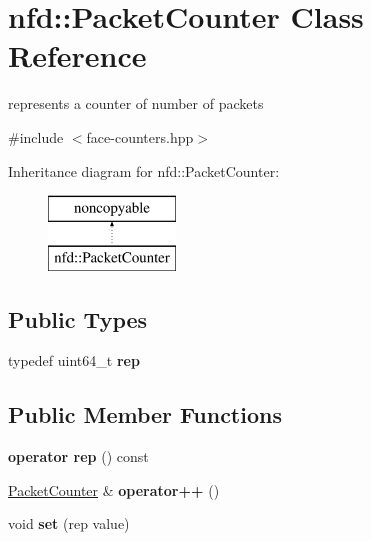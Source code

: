 \hypertarget{classnfd_1_1PacketCounter}{}\section{nfd\+:\+:Packet\+Counter Class Reference}
\label{classnfd_1_1PacketCounter}


represents a counter of number of packets  




{\ttfamily \#include $<$face-\/counters.\+hpp$>$}

Inheritance diagram for nfd\+:\+:Packet\+Counter\+:\begin{figure}[H]
\begin{center}
\leavevmode
\includegraphics[height=2.000000cm]{classnfd_1_1PacketCounter}
\end{center}
\end{figure}
\subsection*{Public Types}
\begin{DoxyCompactItemize}
\item 
typedef uint64\+\_\+t {\bfseries rep}\hypertarget{classnfd_1_1PacketCounter_a3b1e4be596cc8d82aac47de69673c38a}{}\label{classnfd_1_1PacketCounter_a3b1e4be596cc8d82aac47de69673c38a}

\end{DoxyCompactItemize}
\subsection*{Public Member Functions}
\begin{DoxyCompactItemize}
\item 
{\bfseries operator rep} () const\hypertarget{classnfd_1_1PacketCounter_a01e47669b314a314b9bf6f4ae7be7a27}{}\label{classnfd_1_1PacketCounter_a01e47669b314a314b9bf6f4ae7be7a27}

\item 
\hyperlink{classnfd_1_1PacketCounter}{Packet\+Counter} \& {\bfseries operator++} ()\hypertarget{classnfd_1_1PacketCounter_a2e0084d28480ac1fedf2c2f9efccc892}{}\label{classnfd_1_1PacketCounter_a2e0084d28480ac1fedf2c2f9efccc892}

\item 
void {\bfseries set} (rep value)\hypertarget{classnfd_1_1PacketCounter_af7ac74b28327e4855600be4fecf7649c}{}\label{classnfd_1_1PacketCounter_af7ac74b28327e4855600be4fecf7649c}

\end{DoxyCompactItemize}


